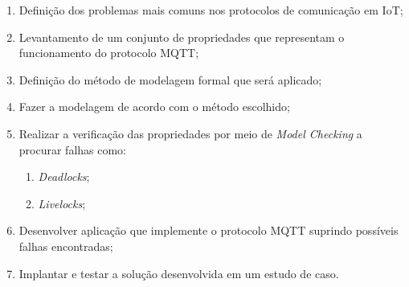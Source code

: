 \begin{enumerate}
    \item Definição dos problemas mais comuns nos protocolos de comunicação em IoT;
    \item Levantamento de um conjunto de propriedades que representam o funcionamento do protocolo MQTT;
    \item Definição do método de modelagem formal que será aplicado;
    \item Fazer a modelagem de acordo com o método escolhido;
    \item Realizar a verificação das propriedades por meio de \textit{Model Checking} a procurar falhas como:
        \begin{enumerate}
            \item \textit{Deadlocks};
            \item \textit{Livelocks};
        \end{enumerate}
    \item Desenvolver aplicação que implemente o protocolo MQTT suprindo possíveis falhas encontradas;
    \item Implantar e testar a solução desenvolvida em um estudo de caso.
\end{enumerate}



